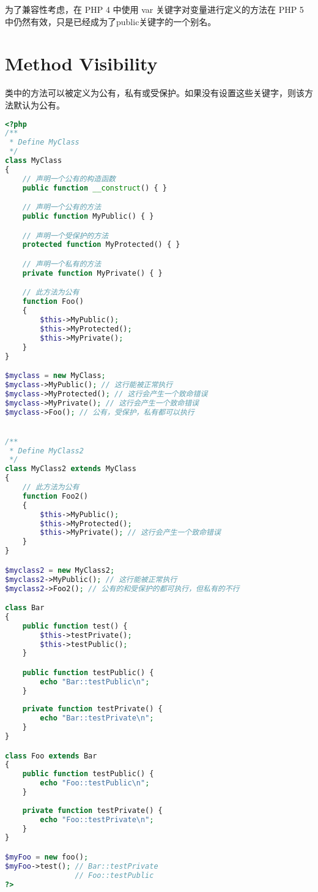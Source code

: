 为了兼容性考虑，在 PHP 4 中使用 var 关键字对变量进行定义的方法在 PHP 5 中仍然有效，只是已经成为了public关键字的一个别名。

\section{Method Visibility}

类中的方法可以被定义为公有，私有或受保护。如果没有设置这些关键字，则该方法默认为公有。


\begin{lstlisting}[language=PHP]
<?php
/**
 * Define MyClass
 */
class MyClass
{
    // 声明一个公有的构造函数
    public function __construct() { }

    // 声明一个公有的方法
    public function MyPublic() { }

    // 声明一个受保护的方法
    protected function MyProtected() { }

    // 声明一个私有的方法
    private function MyPrivate() { }

    // 此方法为公有
    function Foo()
    {
        $this->MyPublic();
        $this->MyProtected();
        $this->MyPrivate();
    }
}

$myclass = new MyClass;
$myclass->MyPublic(); // 这行能被正常执行
$myclass->MyProtected(); // 这行会产生一个致命错误
$myclass->MyPrivate(); // 这行会产生一个致命错误
$myclass->Foo(); // 公有，受保护，私有都可以执行


/**
 * Define MyClass2
 */
class MyClass2 extends MyClass
{
    // 此方法为公有
    function Foo2()
    {
        $this->MyPublic();
        $this->MyProtected();
        $this->MyPrivate(); // 这行会产生一个致命错误
    }
}

$myclass2 = new MyClass2;
$myclass2->MyPublic(); // 这行能被正常执行
$myclass2->Foo2(); // 公有的和受保护的都可执行，但私有的不行

class Bar 
{
    public function test() {
        $this->testPrivate();
        $this->testPublic();
    }

    public function testPublic() {
        echo "Bar::testPublic\n";
    }
    
    private function testPrivate() {
        echo "Bar::testPrivate\n";
    }
}

class Foo extends Bar 
{
    public function testPublic() {
        echo "Foo::testPublic\n";
    }
    
    private function testPrivate() {
        echo "Foo::testPrivate\n";
    }
}

$myFoo = new foo();
$myFoo->test(); // Bar::testPrivate 
                // Foo::testPublic
?>
\end{lstlisting}



